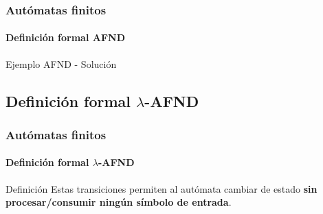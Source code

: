 \documentclass{beamer}
\begin{document}
        \begin{frame}
			\frametitle{Aut\'omatas finitos}
			\framesubtitle{Definici\'on formal AFND}

            \begin{exampleblock}{Ejemplo AFND - Soluci\'on}
               \begin{center}
			   \end{center}
            \end{exampleblock}
		\end{frame}

        \subsection{Definici\'on formal $\lambda$-AFND}

        \begin{frame}
			\frametitle{Aut\'omatas finitos}
			\framesubtitle{Definici\'on formal $\lambda$-AFND}

            \begin{block}{Definici\'on}
                Estas transiciones permiten al aut\'omata cambiar de estado \textbf{sin procesar/consumir ning\'un s\'imbolo de entrada}.
            \end{block}
		\end{frame}
\end{document}
